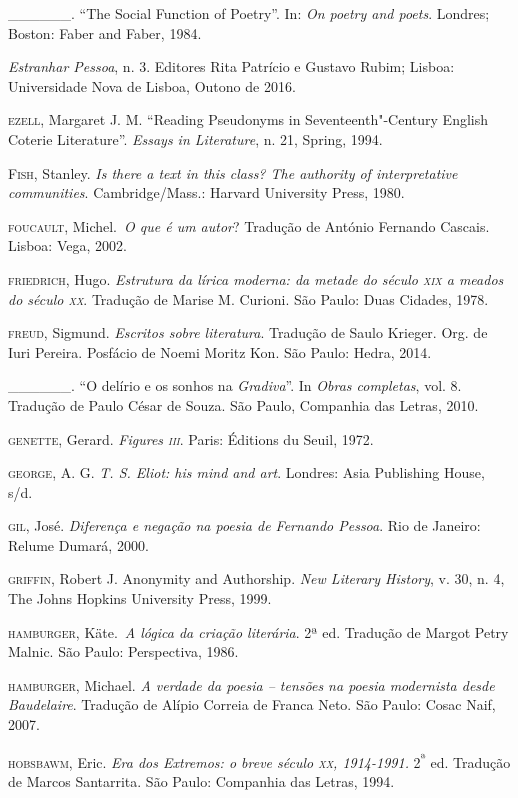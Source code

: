 \begin{Parskip}
\_\_\_\_\_\_. ``The Social Function of Poetry''. In: \emph{On poetry and
poets}. Londres; Boston: Faber and Faber, 1984.

\emph{Estranhar Pessoa}, n. 3. Editores Rita Patrício e Gustavo Rubim;
Lisboa: Universidade Nova de Lisboa, Outono de 2016.

\textsc{ezell}, Margaret J. M. ``Reading Pseudonyms in
Seventeenth"-Century English Coterie Literature''. \emph{Essays in
Literature}, n. 21, Spring, 1994.

\textsc{Fish}, Stanley. \emph{Is there a text in this class? The
authority of interpretative communities}. Cambridge/Mass.: Harvard
University Press, 1980.

\textsc{foucault}, Michel.~\emph{O que é um autor}? Tradução de António
Fernando Cascais. Lisboa: Vega, 2002.

\textsc{friedrich}, Hugo. \emph{Estrutura da lírica moderna: da metade
do século \textsc{xix} a meados do século \textsc{xx}}. Tradução de
Marise M. Curioni. São Paulo: Duas Cidades, 1978.

\textsc{freud}, Sigmund. \emph{Escritos sobre literatura}. Tradução de
Saulo Krieger. Org. de Iuri Pereira. Posfácio de Noemi Moritz Kon. São
Paulo: Hedra, 2014.

\_\_\_\_\_\_. ``O delírio e os sonhos na \emph{Gradiva}''. In
\emph{Obras completas}, vol. 8. Tradução de Paulo César de Souza. São
Paulo, Companhia das Letras, 2010.

\textsc{genette}, Gerard. \emph{Figures \textsc{iii}}. Paris: Éditions
du Seuil, 1972.

\textsc{george}, A. G. \emph{T. S. Eliot: his mind and art}. Londres:
Asia Publishing House, s/d.

\textsc{gil}, José. \emph{Diferença e negação na poesia de Fernando
Pessoa}. Rio de Janeiro: Relume Dumará, 2000.

\textsc{griffin}, Robert J. Anonymity and Authorship. \emph{New Literary
History}, v. 30, n. 4, The Johns Hopkins University Press, 1999.

\textsc{hamburger}, Käte.~\emph{A lógica da criação literária}. 2ª ed.
Tradução de Margot Petry Malnic. São Paulo: Perspectiva, 1986.

\textsc{hamburger}, Michael. \emph{A verdade da poesia -- tensões na
poesia modernista desde Baudelaire}. Tradução de Alípio Correia de Franca
Neto. São Paulo: Cosac Naif, 2007.

\textsc{hobsbawm}, Eric. \emph{Era dos Extremos: o breve século
\textsc{xx}, 1914-1991.} 2\textsuperscript{ª} ed. Tradução de Marcos
Santarrita. São Paulo: Companhia das Letras, 1994.


\end{Parskip}

